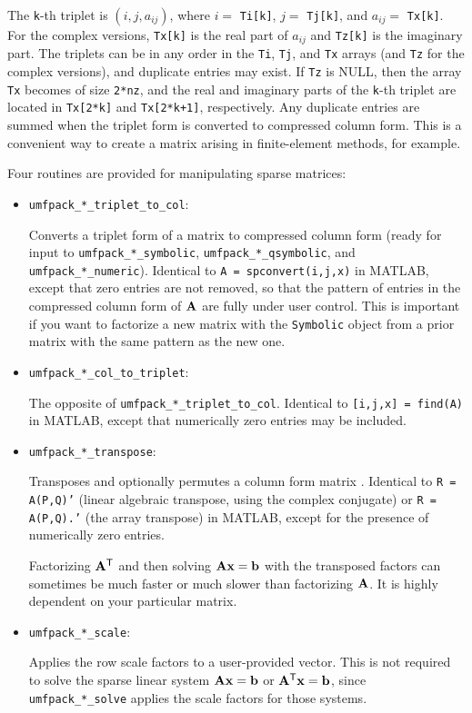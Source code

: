\documentclass[11pt]{article}
\newcommand{\m}[1]{{\bf{#1}}}       %
\newcommand{\tr}{^{\sf T}}          %
\begin{document}
The {\tt k}-th triplet is $(i,j,a_{ij})$, where $i =$ {\tt Ti[k]},
$j =$ {\tt Tj[k]}, and $a_{ij} =$ {\tt Tx[k]}.  For the complex versions,
{\tt Tx[k]} is the real part of $a_{ij}$ and
{\tt Tz[k]} is the imaginary part.
The triplets can be in any
order in the {\tt Ti}, {\tt Tj}, and {\tt Tx} arrays (and {\tt Tz} for
the complex versions), and duplicate entries may
exist.  
If {\tt Tz} is NULL, then the array {\tt Tx} becomes of size {\tt 2*nz},
and the real and imaginary parts of the
{\tt k}-th triplet are located in {\tt Tx[2*k]} and {\tt Tx[2*k+1]},
respectively.
Any duplicate entries are summed when the triplet form is converted to
compressed column form.  This is a convenient way to create a matrix arising in
finite-element methods, for example.

Four routines are provided for manipulating sparse matrices:

\begin{itemize}
\item {\tt umfpack\_*\_triplet\_to\_col}:

    Converts a triplet form of a matrix to compressed column form (ready for
    input to \newline
    {\tt umfpack\_*\_symbolic}, {\tt umfpack\_*\_qsymbolic}, and
    {\tt umfpack\_*\_numeric}).  Identical to {\tt A = spconvert(i,j,x)} in
    MATLAB, except that zero entries are not removed, so that the pattern of
    entries in the compressed column form of $\m{A}$ are fully under user
    control.  This is important if you want to factorize a new matrix with the
    {\tt Symbolic} object from a prior matrix with the same pattern as the new
    one.

\item {\tt umfpack\_*\_col\_to\_triplet}:

    The opposite of {\tt umfpack\_*\_triplet\_to\_col}.  Identical to
    {\tt [i,j,x] = find(A)} in MATLAB, except that numerically zero entries
    may be included.

\item {\tt umfpack\_*\_transpose}:

    Transposes and optionally permutes a column form matrix \cite{Gustavson78}.
    Identical to
    {\tt R = A(P,Q)'} (linear algebraic transpose, using the complex conjugate)
    or {\tt R = A(P,Q).'} (the array transpose)
    in MATLAB, except for the presence of numerically zero entries.

    Factorizing $\m{A}\tr$ and then solving $\m{Ax}=\m{b}$ with the transposed
    factors can sometimes be much faster or much slower than factorizing
    $\m{A}$.  It is highly dependent on your particular matrix.

\item {\tt umfpack\_*\_scale}:

    Applies the row scale factors to a user-provided vector.  This is not
    required to solve the sparse linear system $\m{Ax}=\m{b}$ or
    $\m{A}\tr\m{x}=\m{b}$, since {\tt umfpack\_*\_solve} applies the scale
    factors for those systems.

\end{itemize}
\end{document}
